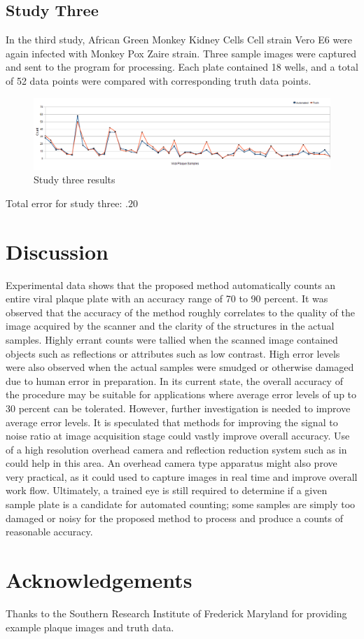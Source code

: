 \documentclass[11pt,final,twocolumn]{IEEEtran}
\begin{document}
\subsection{Study Three}
In the third study, African Green Monkey Kidney Cells  Cell strain Vero E6 were again infected with Monkey Pox Zaire strain. Three sample images were captured and sent to the program for processing. Each plate contained 18 wells, and a total of 52 data points were compared with corresponding truth data points.
\begin{figure}[H]
\centering
\includegraphics[width=.4\textwidth]{Study3Results.png}
\caption{Study three results}
\label{fig:study3Results}
\end{figure}
Total error for study three: $.20$ 


\section{Discussion}
Experimental data shows that the proposed method automatically counts an entire viral plaque plate with an accuracy range of 70 to 90 percent. It was observed that the accuracy of the method roughly correlates to the quality of the image acquired by the scanner and the clarity of the structures in the actual samples. Highly errant counts were tallied when the scanned image contained objects such as reflections or attributes such as low contrast. High error levels were also observed when the actual samples were smudged or otherwise damaged due to human error in preparation. In its current state, the overall accuracy of the procedure may be suitable for applications where average error levels of up to 30 percent can be tolerated. However, further investigation is needed to improve average error levels. It is speculated that methods for improving the signal to noise ratio at image acquisition stage could vastly improve overall accuracy. Use of a high resolution overhead camera and reflection reduction system such as in ~\cite{watershed} could help in this area. An overhead camera type apparatus might also prove very practical, as it could used to capture images in real time and improve overall work flow. Ultimately, a trained eye is still required to determine if a given sample plate is a candidate for automated counting; some samples are simply too damaged or noisy for the proposed method to process and produce a counts of reasonable accuracy. 




\appendix

\section{Acknowledgements}
Thanks to the Southern Research Institute of Frederick Maryland for providing example plaque images and truth data.
\end{document}
